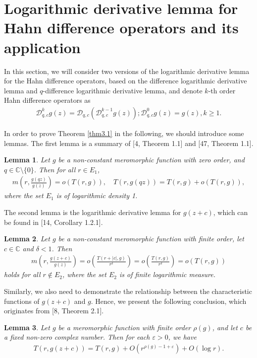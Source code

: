 \documentclass[sn-mathphys-num]{sn-jnl}%
\theoremstyle{thmstyleone}%
\theoremstyle{thmstyletwo}%
\newtheorem{lemma}{Lemma}
\theoremstyle{thmstylethree}%
\begin{document}
\section{Logarithmic derivative lemma for Hahn difference operators and its application}

\indent In this section, we will consider two versions of the logarithmic derivative lemma for the Hahn difference operators, based on the difference logarithmic derivative lemma and $q$-difference logarithmic derivative lemma, and denote $k$-th order Hahn difference operators as
\begin{align*}
	\mathcal{D}_{q,c}^{k}g(z)=\mathcal{D}_{q,c}(\mathcal{D}_{q,c}^{k-1}g(z)); \mathcal{D}_{q,c}^{0}g(z)=g(z), k\geq1.
\end{align*}

\indent In order to prove Theorem \ref{thm3.1} in the following, we should introduce some lemmas. The first lemma is a summary of [4, Theorem 1.1] and [47, Theorem 1.1].
\begin{lemma}\cite{BH, zhang}\label{l3.1}
	Let $g$ be a non-constant meromorphic function with zero order, and $q\in\mathbb{C}\setminus\{0\}$. Then for all $r\in E_{1}$,
	\begin{align*}\label{l3.1'}
		m\left(r,\frac{g(qz)}{g(z)}\right)=o(T(r,g)),\quad T(r,g(qz))=T(r,g)+o(T(r,g)),
	\end{align*}
	where the set $E_{1}$ is of logarithmic density 1.
\end{lemma}
\indent The second lemma is the logarithmic derivative lemma for \(g(z+c)\), which can be found in [14, Corollary 1.2.1].
\begin{lemma}\cite{HK1}\label{l3.2}
	Let $g$ be a non-constant meromorphic function with finite order, let $c\in\mathbb{C}$ and $\delta<1$. Then
	\begin{align*}%
		m\left(r,\frac{g(z+c)}{g(z)}\right)=o\left(\frac{T(r+|c|,g)}{r^{\delta}}\right)=o\left(\frac{T(r,g)}{r^{\delta}}\right)=o(T(r,g))
	\end{align*}
	holds for all $r\not\in E_{2}$, where the set $E_{2}$ is of finite logarithmic measure.
\end{lemma}
\indent Similarly, we also need to demonstrate the relationship between the characteristic functions of \(g(z+c)\) and \(g\). Hence, we present the following conclusion, which originates from [8, Theorem 2.1].
\begin{lemma}\cite{CF1}\label{l3.3}
	Let $g$ be a meromorphic function with finite order \(\rho(g)\), and let \(c\) be a fixed non-zero complex number. Then for each \(\varepsilon>0\), we have
	\begin{align*}%
		T(r,g(z+c))=T(r,g)+O(r^{\rho(g)-1+\varepsilon})+O(\log r).
	\end{align*}
\end{lemma}
\end{document}
